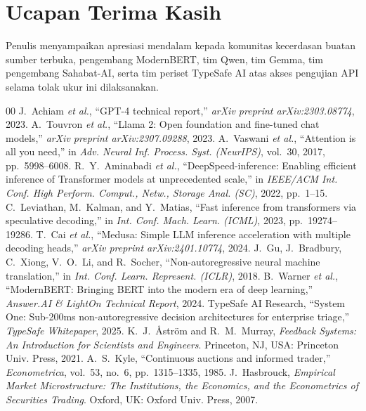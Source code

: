 \documentclass[journal,compsoc]{IEEEtran}
\begin{document}
\section*{Ucapan Terima Kasih}
Penulis menyampaikan apresiasi mendalam kepada komunitas kecerdasan buatan sumber terbuka, pengembang ModernBERT, tim Qwen, tim Gemma, tim pengembang Sahabat-AI, serta tim periset TypeSafe AI atas akses pengujian API selama tolak ukur ini dilaksanakan.

\begin{thebibliography}{00}
 J.~Achiam \textit{et al.}, ``GPT-4 technical report,'' \textit{arXiv preprint arXiv:2303.08774}, 2023.
 A.~Touvron \textit{et al.}, ``Llama 2: Open foundation and fine-tuned chat models,'' \textit{arXiv preprint arXiv:2307.09288}, 2023.
 A.~Vaswani \textit{et al.}, ``Attention is all you need,'' in \textit{Adv. Neural Inf. Process. Syst. (NeurIPS)}, vol.~30, 2017, pp.~5998--6008.
 R.~Y.~Aminabadi \textit{et al.}, ``DeepSpeed-inference: Enabling efficient inference of Transformer models at unprecedented scale,'' in \textit{IEEE/ACM Int. Conf. High Perform. Comput., Netw., Storage Anal. (SC)}, 2022, pp.~1--15.
 C.~Leviathan, M.~Kalman, and Y.~Matias, ``Fast inference from transformers via speculative decoding,'' in \textit{Int. Conf. Mach. Learn. (ICML)}, 2023, pp.~19274--19286.
 T.~Cai \textit{et al.}, ``Medusa: Simple LLM inference acceleration with multiple decoding heads,'' \textit{arXiv preprint arXiv:2401.10774}, 2024.
 J.~Gu, J.~Bradbury, C.~Xiong, V.~O.~Li, and R.~Socher, ``Non-autoregressive neural machine translation,'' in \textit{Int. Conf. Learn. Represent. (ICLR)}, 2018.
 B.~Warner \textit{et al.}, ``ModernBERT: Bringing BERT into the modern era of deep learning,'' \textit{Answer.AI \& LightOn Technical Report}, 2024.
 TypeSafe AI Research, ``System One: Sub-200ms non-autoregressive decision architectures for enterprise triage,'' \textit{TypeSafe Whitepaper}, 2025.
 K.~J.~{\AA}str{\"o}m and R.~M.~Murray, \textit{Feedback Systems: An Introduction for Scientists and Engineers}. Princeton, NJ, USA: Princeton Univ. Press, 2021.
 A.~S.~Kyle, ``Continuous auctions and informed trader,'' \textit{Econometrica}, vol.~53, no.~6, pp.~1315--1335, 1985.
 J.~Hasbrouck, \textit{Empirical Market Microstructure: The Institutions, the Economics, and the Econometrics of Securities Trading}. Oxford, UK: Oxford Univ. Press, 2007.

\end{thebibliography}
\end{document}
